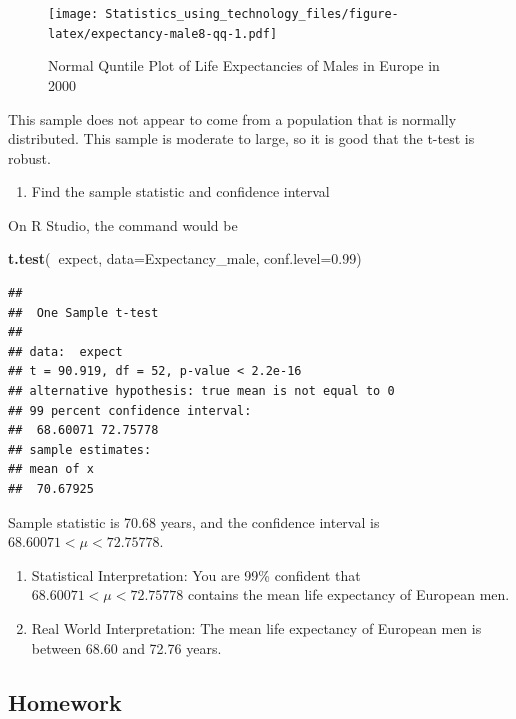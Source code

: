 \documentclass[
]{book}
\newenvironment{Shaded}{\begin{snugshade}}{\end{snugshade}}
\newcommand{\DataTypeTok}[1]{\textcolor[rgb]{0.13,0.29,0.53}{#1}}
\newcommand{\FloatTok}[1]{\textcolor[rgb]{0.00,0.00,0.81}{#1}}
\newcommand{\KeywordTok}[1]{\textcolor[rgb]{0.13,0.29,0.53}{\textbf{#1}}}
\newcommand{\NormalTok}[1]{#1}
\newcommand{\OperatorTok}[1]{\textcolor[rgb]{0.81,0.36,0.00}{\textbf{#1}}}
\providecommand{\tightlist}{%
  \setlength{\itemsep}{0pt}\setlength{\parskip}{0pt}}
\begin{document}
\begin{figure}
\centering
\texttt{[image: Statistics\_using\_technology\_files/figure-latex/expectancy-male8-qq-1.pdf]}
\caption{\label{fig:expectancy-male8-qq}Normal Quntile Plot of Life Expectancies of Males in Europe in 2000}
\end{figure}

This sample does not appear to come from a population that is normally distributed. This sample is moderate to large, so it is good that the t-test is robust.

\begin{enumerate}
\def\labelenumi{\arabic{enumi}.}
\setcounter{enumi}{2}
\tightlist
\item
  Find the sample statistic and confidence interval
\end{enumerate}

On R Studio, the command would be

\begin{Shaded}
\begin{Highlighting}[]
\KeywordTok{t.test}\NormalTok{(}\OperatorTok{~}\NormalTok{expect, }\DataTypeTok{data=}\NormalTok{Expectancy_male, }\DataTypeTok{conf.level=}\FloatTok{0.99}\NormalTok{)}
\end{Highlighting}
\end{Shaded}

\begin{verbatim}
## 
##  One Sample t-test
## 
## data:  expect
## t = 90.919, df = 52, p-value < 2.2e-16
## alternative hypothesis: true mean is not equal to 0
## 99 percent confidence interval:
##  68.60071 72.75778
## sample estimates:
## mean of x 
##  70.67925
\end{verbatim}

Sample statistic is 70.68 years, and the confidence interval is \(68.60071<\mu<72.75778\).

\begin{enumerate}
\def\labelenumi{\arabic{enumi}.}
\setcounter{enumi}{3}
\item
  Statistical Interpretation: You are 99\% confident that \(68.60071<\mu<72.75778\) contains the mean life expectancy of European men.
\item
  Real World Interpretation: The mean life expectancy of European men is between 68.60 and 72.76 years.
\end{enumerate}

\hypertarget{homework-21}{%
\subsection{Homework}\label{homework-21}}
\end{document}
